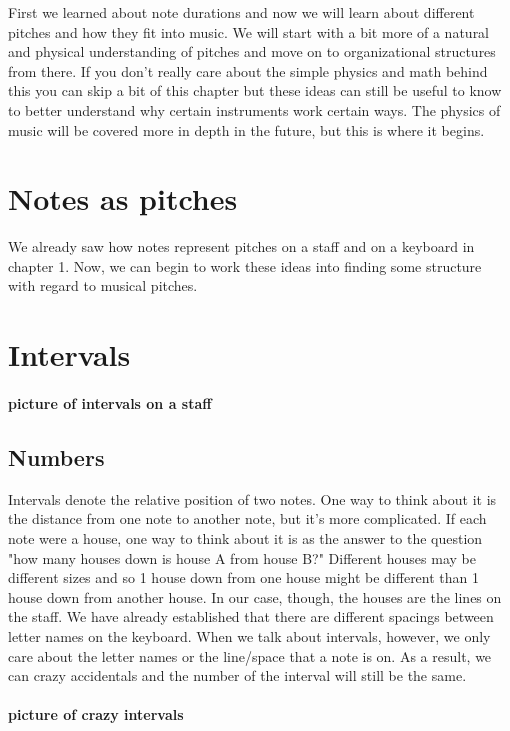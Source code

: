 \documentclass[../OpenAppliedMusicTheory.tex]{subfiles}
\begin{document}
    
    First we learned about note durations and now we will learn about different pitches and how they fit into music. We will start with a bit more of a natural and physical understanding of pitches and move on to organizational structures from there. If you don't really care about the simple physics and math behind this you can skip a bit of this chapter but these ideas can still be useful to know to better understand why certain instruments work certain ways. The physics of music will be covered more in depth in the future, but this is where it begins. %

    \section{Notes as pitches}\label{ch3:note-pitches}
    We already saw how notes represent pitches on a staff and on a keyboard in chapter 1. %
    Now, we can begin to work these ideas into finding some structure with regard to musical pitches.

    \section{Intervals}\label{ch3:intervals}
    \paragraph{picture of intervals on a staff}
    \subsection{Numbers}
    Intervals denote the relative position of two notes. One way to think about it is the distance from one note to another note, but it's more complicated. If each note were a house, one way to think about it is as the answer to the question "how many houses down is house A from house B?" %
    Different houses may be different sizes and so 1 house down from one house might be different than 1 house down from another house. In our case, though, the houses are the lines on the staff. We have already established that there are different spacings between letter names on the keyboard. When we talk about intervals, however, we only care about the letter names or the line/space that a note is on. As a result, we can crazy accidentals and the number of the interval will still be the same. \paragraph{picture of crazy intervals}
\end{document}
